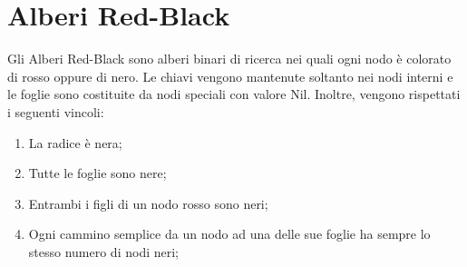 \section{Alberi Red-Black}
\begin{definition}
    Gli Alberi Red-Black sono alberi binari di ricerca nei quali ogni nodo è
    colorato di rosso oppure di nero. Le chiavi vengono mantenute soltanto nei
    nodi interni e le foglie sono costituite da nodi speciali con valore Nil.
    Inoltre, vengono rispettati i seguenti vincoli:
    \begin{enumerate}
        \item La radice è nera;
        \item Tutte le foglie sono nere;
        \item Entrambi i figli di un nodo rosso sono neri;
        \item Ogni cammino semplice da un nodo ad una delle sue foglie ha sempre
        lo stesso numero di nodi neri;
    \end{enumerate}
\end{definition}

